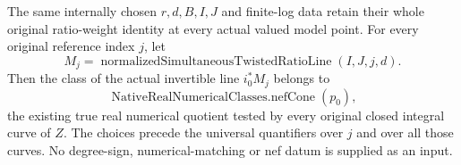 \begin{theorem}
\label{thm:intrinsic-original-convex-central-nef}
\leanok
{}
The same internally chosen $r,d,B,I,J$ and finite-log data retain their
whole original ratio-weight identity at every actual valued model
point.  For every original reference index $j$, let
\[
 M_j=\operatorname{normalizedSimultaneousTwistedRatioLine}(I,J,j,d).
\]
Then the class of the actual invertible line $i_0^*M_j$ belongs to
\[
 \operatorname{NativeRealNumericalClasses.nefCone}(p_0),
\]
the existing true real numerical quotient tested by every original
closed integral curve of $Z$.  The choices precede the universal
quantifiers over $j$ and over all those curves.  No degree-sign,
numerical-matching or nef datum is supplied as an input.
\end{theorem}
